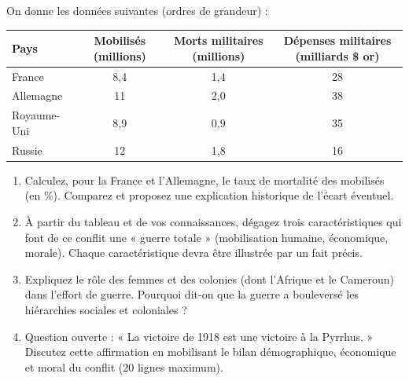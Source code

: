 \documentclass[11pt]{article}
\begin{document}
\begin{exercice}
On donne les données suivantes (ordres de grandeur) :

\begin{center}
\begin{tabular}{|l|c|c|c|}
\hline
\textbf{Pays} & \textbf{Mobilisés (millions)} & \textbf{Morts militaires (millions)} & \textbf{Dépenses militaires (milliards \$ or)} \\
\hline
France & 8,4 & 1,4 & 28 \\
Allemagne & 11 & 2,0 & 38 \\
Royaume-Uni & 8,9 & 0,9 & 35 \\
Russie & 12 & 1,8 & 16 \\
\hline
\end{tabular}
\end{center}

\begin{enumerate}
\item Calculez, pour la France et l'Allemagne, le taux de mortalité des mobilisés (en \%). Comparez et proposez une explication historique de l'écart éventuel.
\item À partir du tableau et de vos connaissances, dégagez trois caractéristiques qui font de ce conflit une « guerre totale » (mobilisation humaine, économique, morale). Chaque caractéristique devra être illustrée par un fait précis.
\item Expliquez le rôle des femmes et des colonies (dont l'Afrique et le Cameroun) dans l'effort de guerre. Pourquoi dit-on que la guerre a bouleversé les hiérarchies sociales et coloniales ?
\item Question ouverte : « La victoire de 1918 est une victoire à la Pyrrhus. » Discutez cette affirmation en mobilisant le bilan démographique, économique et moral du conflit (20 lignes maximum).
\end{enumerate}
\end{exercice}
\end{document}
